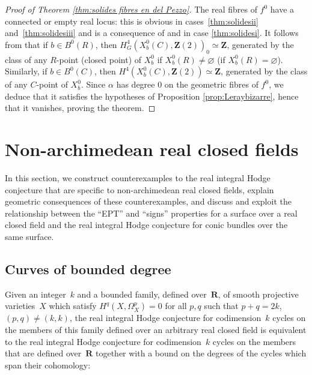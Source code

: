 \documentclass[JEP,XML,SOM,Unicode]{cedram}
\theoremstyle{plain}
\theoremstyle{definition}
\numberwithin{equation}{section}
\newcommand{\R}{{\mathbf R}}
\newcommand{\Z}{{\mathbf Z}}
\renewcommand{\emptyset}{\varnothing}
\begin{document}
\begin{proof}[Proof of Theorem \ref{thm:solides fibres en del Pezzo}]
The real fibres of $f^0$ have a connected or empty real locus: this is obvious in cases~\eqref{thm:solidesii} and~\eqref{thm:solidesiii} and is a consequence of
\cite[Cor.\,3 to Th.\,3.7, Cor.\,1 to Th.\,3.10, Th.\,3.15]{maninrational}
and \cite[Th.\,13.3]{delfsknebuschbasictheory2} in case \eqref{thm:solidesi}.
It follows from \cite[Lem.\,\ref*{BW1-lem:H2dreel}]{BW1}
that if $b\in B^0(R)$, then $H^4_G(X_b^0(C),\Z(2))_0\simeq\Z$, generated by the class of any $R$-point (\resp closed point) of $X_b^0$ if $X_b^0(R)\neq\emptyset$ (\resp if $X_b^0(R)=\emptyset$). Similarly, if $b\in B^0(C)$, then $H^4(X_b^0(C),\Z(2))\simeq\Z$, generated by the class of any $C$-point of $X_b^0$. Since $\alpha$ has degree $0$ on the geometric fibres of $f^0$, we deduce that
it satisfies the hypotheses of Proposition \ref{prop:Leraybizarre}, hence that it vanishes, proving the theorem.
\end{proof}

\section{Non-archimedean real closed fields}
\label{nonarchimedeansection}

In this section, we construct counterexamples to the real integral Hodge conjecture that are specific to non-archimedean real closed fields, explain geometric consequences of these counterexamples,
and discuss and exploit the relationship between
the ``EPT'' and ``signs'' properties for a surface over a real closed field
and the real integral Hodge conjecture for conic bundles over the same surface.

\subsection{Curves of bounded degree}
\label{subsec:curves of bounded degree}

Given an integer~$k$ and a bounded family, defined over~$\R$, of smooth projective
varieties~$X$ which satisfy $H^q(X,\Omega_X^p)=0$ for all $p,q$ such that $p+q=2k$, $(p,q)\neq (k,k)$,
the real integral Hodge conjecture
for codimension~$k$ cycles on the members of this family defined over an arbitrary real closed
field
is equivalent
to the real integral Hodge conjecture for codimension~$k$ cycles
on the members that are defined over~$\R$ together with
a bound on the degrees of the cycles which span their cohomology:
\end{document}
